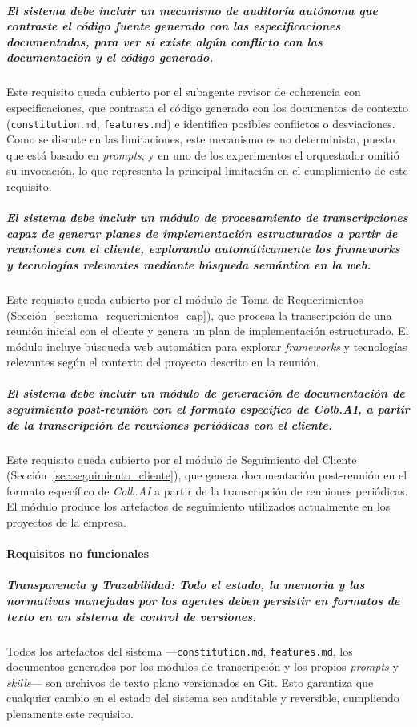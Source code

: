 \documentclass[11pt, letterpaper]{article}
\begin{document}
\subparagraph{El sistema debe incluir un mecanismo de auditoría autónoma que contraste el código fuente generado con las especificaciones documentadas, para ver si existe algún conflicto con las documentación y el código generado.}
Este requisito queda cubierto por el subagente revisor de coherencia con especificaciones, que contrasta el código generado con los documentos de contexto (\texttt{constitution.md}, \texttt{features.md}) e identifica posibles conflictos o desviaciones. Como se discute en las limitaciones, este mecanismo es no determinista, puesto que está basado en \textit{prompts}, y en uno de los experimentos el orquestador omitió su invocación, lo que representa la principal limitación en el cumplimiento de este requisito.

\subparagraph{El sistema debe incluir un módulo de procesamiento de transcripciones capaz de generar planes de implementación estructurados a partir de reuniones con el cliente, explorando automáticamente los \textit{frameworks} y tecnologías relevantes mediante búsqueda semántica en la web.}
Este requisito queda cubierto por el módulo de Toma de Requerimientos (Sección~\ref{sec:toma_requerimientos_cap}), que procesa la transcripción de una reunión inicial con el cliente y genera un plan de implementación estructurado. El módulo incluye búsqueda web automática para explorar \textit{frameworks} y tecnologías relevantes según el contexto del proyecto descrito en la reunión.

\subparagraph{El sistema debe incluir un módulo de generación de documentación de seguimiento post-reunión con el formato específico de \textit{Colb.AI}, a partir de la transcripción de reuniones periódicas con el cliente.}
Este requisito queda cubierto por el módulo de Seguimiento del Cliente (Sección~\ref{sec:seguimiento_cliente}), que genera documentación post-reunión en el formato específico de \textit{Colb.AI} a partir de la transcripción de reuniones periódicas. El módulo produce los artefactos de seguimiento utilizados actualmente en los proyectos de la empresa.

\paragraph{Requisitos no funcionales}

\subparagraph{Transparencia y Trazabilidad: Todo el estado, la memoria y las normativas manejadas por los agentes deben persistir en formatos de texto en un sistema de control de versiones.}
Todos los artefactos del sistema ---\texttt{constitution.md}, \texttt{features.md}, los documentos generados por los módulos de transcripción y los propios \textit{prompts} y \textit{skills}--- son archivos de texto plano versionados en Git. Esto garantiza que cualquier cambio en el estado del sistema sea auditable y reversible, cumpliendo plenamente este requisito.
\end{document}
